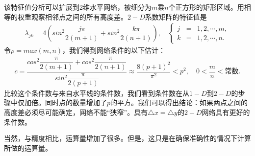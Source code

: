该特征值分析可以扩展到2维水平网络，被细分为$m$乘$n$个正方形的矩形区域。用相等的权重观察相邻点之间的所有高度差。$ 2-D$系数矩阵的特征值是
\begin{align*}
\lambda_{jk}=4(sin^{2}\dfrac{j\pi}{2(m+1)}+sin^{2}\dfrac{k\pi}{2(n+1)}), \quad
\left\{
\begin{aligned}
j & = & 1,2,\cdots,m, \\
k & = & 1,2,\cdots,n. 
\end{aligned}
\right.
\end{align*}
令$ \rho=max(m,n) $，我们得到网络条件的以下估计：
\begin{align*}
c=\dfrac{cos^{2}\dfrac{\pi}{2(m+1)}+cos^{2}\dfrac{\pi}{2(n+1)}}{sin^{2}\dfrac{\pi}{2(p+1)}}\approx\dfrac{8(p+1)^{2}}{\pi^{2}}<p^{2}, \quad 0<\dfrac{m}{n}<\text{常数}.
\end{align*}
比较这个条件数与来自水平线的条件数，我们看到条件数在从$1-D$到$2-D$的步骤中仅加倍。同时点的数量增加了$p$的平方。我们可以得出结论：如果两点之间的高度差必须尽可能确定，网络不能“狭窄”。具有$ \bigtriangleup x = \bigtriangleup y$的$2-D$网络具有更好的条件数。

当然，与精度相比，运算量增加了很多。但是，这只是在确保准确性的情况下计算所做的运算量。




